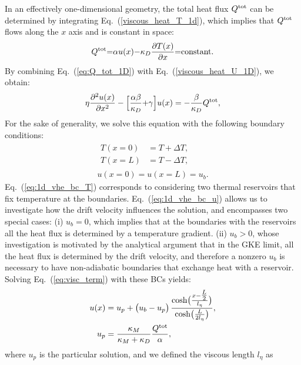 \documentclass[
prb,
twocolumn,
superscriptaddress,
 amsmath,amssymb,
 aps,
longbibliography,
]{revtex4-2}
\begin{document}
In an effectively one-dimensional geometry, the total heat flux $Q^{\rm tot}$ can be determined by integrating Eq.~(\ref{viscous_heat_T_1d}), which implies that $Q^{\rm tot}$ flows along the $x$ axis and is constant in space:
\begin{equation}
  Q^{\rm tot}{=}\alpha {u(x)} {-} \kappa_D \frac{\partial T (x)}{\partial x} {=} {\rm constant}.
  \label{eq:Q_tot_1D}
\end{equation}
By combining Eq.~(\ref{eq:Q_tot_1D}) with Eq.~(\ref{viscous_heat_U_1D}), we obtain:
\begin{equation}
 \eta \frac{\partial^2 u(x)}{\partial x^2} - \Big[\frac{\alpha\beta}{\kappa_D} {+} \gamma\Big]
  {u(x)}
   =-\frac{\beta}{\kappa_D}Q^{\rm tot} ,
   \label{eq:visc_term}
\end{equation}
For the sake of generality, we solve this equation with the following boundary conditions:
\begin{gather}
\begin{aligned}
    T(x=0) &= T + \Delta T, \\
    T(x=L) &= T - \Delta T,
\label{eq:1d_vhe_bc_T}
\end{aligned} \\
    u(x=0) = u(x=L) = u_b.
\label{eq:1d_vhe_bc_u}
\end{gather}
Eq.~(\ref{eq:1d_vhe_bc_T}) corresponds to considering two thermal reservoirs that fix temperature at the boundaries. Eq.~(\ref{eq:1d_vhe_bc_u}) allows us to investigate how the drift velocity influences the solution, and encompasses two special cases: (i) $u_b=0$, which implies that at the boundaries with the reservoirs all the heat flux is determined by a temperature gradient. (ii) $u_b>0$, whose investigation is  motivated by the analytical argument that in the GKE limit, all the heat flux is determined by the drift velocity, and therefore a nonzero $u_b$ is necessary to have non-adiabatic boundaries that exchange heat with a reservoir.
Solving Eq.~(\ref{eq:visc_term}) with these BCs yields:
\begin{gather}
\begin{aligned}
u(x)&=u_p+\big(u_b-u_p\big)\,
\frac{\cosh\!\big(\frac{x-\tfrac{L}{2}}{l_\eta}\big)}
{\cosh\!\big(\frac{L}{2l_\eta}\big)},\\
u_p&= \dfrac{\kappa_M}{\kappa_M+\kappa_D} \dfrac{Q^{\rm tot}}{\alpha},
\label{eq:u_sol}
\end{aligned}
\end{gather}
where $u_p$ is the particular solution, and we defined the viscous length $l_\eta$ as
\end{document}
